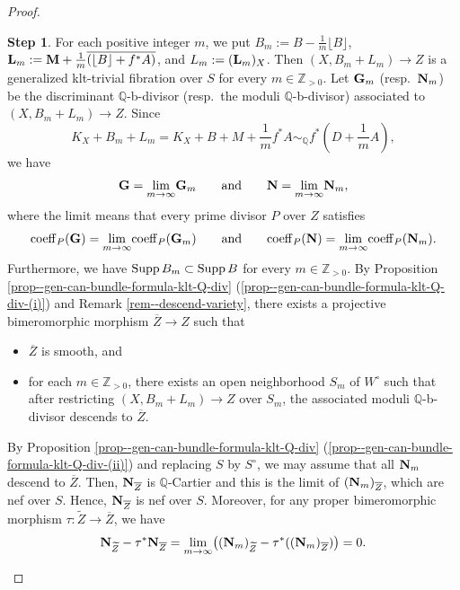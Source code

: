 \documentclass[12pt]{amsart}
\theoremstyle{definition}
\newtheorem{step2}{Step}
\begin{document}
\begin{proof}
\begin{step2}
For each positive integer $m$, we put $B_{m}:=B-\frac{1}{m}\lfloor B \rfloor$, $\boldsymbol{\rm L}_{m}:=\boldsymbol{\rm M}+\frac{1}{m}\overline{(\lfloor B \rfloor+f^{*}A)}$, and $L_{m}:=(\boldsymbol{\rm L}_{m})_{X}$. 
Then $(X,B_{m}+L_{m}) \to Z$ is a generalized klt-trivial fibration over $S$ for every $m \in \mathbb{Z}_{>0}$. 
Let $\boldsymbol{\rm G}_{m}$ (resp.~$\boldsymbol{\rm N}_{m}$) be the discriminant $\mathbb{Q}$-b-divisor (resp.~the moduli $\mathbb{Q}$-b-divisor) associated to $(X,B_{m}+L_{m}) \to Z$. 
Since 
$$K_{X}+B_{m}+L_{m}=K_{X}+B+M+\frac{1}{m}f^{*}A\sim_{\mathbb{Q}}f^{*}(D+\frac{1}{m}A),$$
we have $$\boldsymbol{\rm G}=\underset{m \to \infty}{\rm lim}\boldsymbol{\rm G}_{m} \qquad {\rm and} \qquad \boldsymbol{\rm N}=\underset{m \to \infty}{\rm lim}\boldsymbol{\rm N}_{m},$$where the limit means that
every prime divisor $P$ over $Z$ satisfies 
$${\rm coeff}_{P}(\boldsymbol{\rm G})=\underset{m \to \infty}{\rm lim}{\rm coeff}_{P}(\boldsymbol{\rm G}_{m}) \qquad {\rm and} \qquad {\rm coeff}_{P}(\boldsymbol{\rm N})=\underset{m \to \infty}{\rm lim}{\rm coeff}_{P}(\boldsymbol{\rm N}_{m}).$$
Furthermore, we have ${\rm Supp}\,B_{m}\subset {\rm Supp}\,B$ for every $m \in \mathbb{Z}_{>0}$. 
By Proposition \ref{prop--gen-can-bundle-formula-klt-Q-div} (\ref{prop--gen-can-bundle-formula-klt-Q-div-(i)}) and Remark \ref{rem--descend-variety}, there exists a projective bimeromorphic morphism $\overline{Z} \to Z$ such that 
\begin{itemize}
\item
$\overline{Z}$ is smooth, and 
\item
for each $m \in \mathbb{Z}_{>0}$, there exists an open neighborhood $S_{m}$ of $W^{\circ}$ such that 
after restricting $(X,B_{m}+L_{m}) \to Z$ over $S_{m}$, the associated moduli $\mathbb{Q}$-b-divisor descends to $\overline{Z} $. 
\end{itemize}
By Proposition \ref{prop--gen-can-bundle-formula-klt-Q-div} (\ref{prop--gen-can-bundle-formula-klt-Q-div-(ii)}) and replacing $S$ by $S^{\circ}$, we may assume that all $\boldsymbol{\rm N}_{m}$ descend to $\overline{Z} $. 
Then, $\boldsymbol{\rm N}_{\overline{Z}}$ is $\mathbb{Q}$-Cartier and this is the limit of $(\boldsymbol{\rm N}_{m})_{\overline{Z}}$, which are nef over $S$. 
Hence, $\boldsymbol{\rm N}_{\overline{Z}}$ is nef over $S$. 
Moreover, for any proper bimeromorphic morphism $\tau \colon \widetilde{Z} \to \overline{Z}$, we have
$$\boldsymbol{\rm N}_{\widetilde{Z}}-\tau^{*}\boldsymbol{\rm N}_{\overline{Z}}=\underset{m \to \infty}{\rm lim}\bigl((\boldsymbol{\rm N}_{m})_{\widetilde{Z}}-\tau^{*}((\boldsymbol{\rm N}_{m})_{\overline{Z}})\bigr)=0.$$

\end{step2}
\end{proof}
\end{document}
